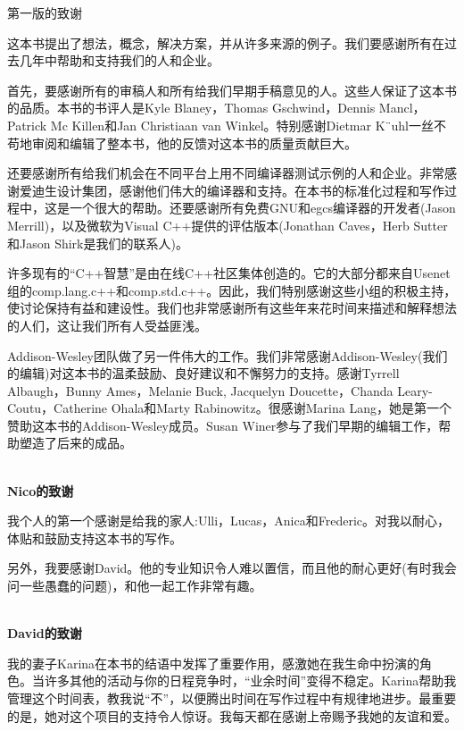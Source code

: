 \begin{flushright}
 第一版的致谢
\end{flushright}

这本书提出了想法，概念，解决方案，并从许多来源的例子。我们要感谢所有在过去几年中帮助和支持我们的人和企业。

首先，要感谢所有的审稿人和所有给我们早期手稿意见的人。这些人保证了这本书的品质。本书的书评人是Kyle Blaney，Thomas Gschwind，Dennis Mancl，Patrick Mc Killen和Jan Christiaan van Winkel。特别感谢Dietmar K¨uhl一丝不苟地审阅和编辑了整本书，他的反馈对这本书的质量贡献巨大。

还要感谢所有给我们机会在不同平台上用不同编译器测试示例的人和企业。非常感谢爱迪生设计集团，感谢他们伟大的编译器和支持。在本书的标准化过程和写作过程中，这是一个很大的帮助。还要感谢所有免费GNU和egcs编译器的开发者(Jason Merrill)，以及微软为Visual C++提供的评估版本(Jonathan Caves，Herb Sutter和Jason Shirk是我们的联系人)。

许多现有的“C++智慧”是由在线C++社区集体创造的。它的大部分都来自Usenet组的comp.lang.c++和comp.std.c++。因此，我们特别感谢这些小组的积极主持，使讨论保持有益和建设性。我们也非常感谢所有这些年来花时间来描述和解释想法的人们，这让我们所有人受益匪浅。

Addison-Wesley团队做了另一件伟大的工作。我们非常感谢Addison-Wesley(我们的编辑)对这本书的温柔鼓励、良好建议和不懈努力的支持。感谢Tyrrell Albaugh，Bunny Ames，Melanie Buck, Jacquelyn Doucette，Chanda Leary-Coutu，Catherine Ohala和Marty Rabinowitz。很感谢Marina Lang，她是第一个赞助这本书的Addison-Wesley成员。Susan Winer参与了我们早期的编辑工作，帮助塑造了后来的成品。

\hspace*{\fill} \\ %
\noindent\textbf{Nico的致谢}

我个人的第一个感谢是给我的家人:Ulli，Lucas，Anica和Frederic。对我以耐心，体贴和鼓励支持这本书的写作。

另外，我要感谢David。他的专业知识令人难以置信，而且他的耐心更好(有时我会问一些愚蠢的问题)，和他一起工作非常有趣。

\hspace*{\fill} \\ %
\noindent\textbf{David的致谢}

我的妻子Karina在本书的结语中发挥了重要作用，感激她在我生命中扮演的角色。当许多其他的活动与你的日程竞争时，“业余时间”变得不稳定。Karina帮助我管理这个时间表，教我说“不”，以便腾出时间在写作过程中有规律地进步。最重要的是，她对这个项目的支持令人惊讶。我每天都在感谢上帝赐予我她的友谊和爱。

